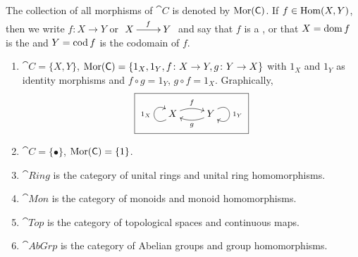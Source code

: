 The collection of all morphisms of $\cat C$ is denoted by $\operatorname{Mor}(\mathsf{C})$. If $f \in \operatorname{Hom}(X, Y)$, then we write $f \colon X \to Y$ or $\xymatrix{X \ar[r]^f & Y}$ and say that $f$ is a , or that $X = \operatorname{dom} f$ is the  and $Y = \operatorname{cod} f$ is the codomain of $f$.

\begin{Example}\label{ex:Categories}
\begin{enumerate}
\item\label{it:Categories2IsoObj} $\cat C = \{X, Y\}$, $\operatorname{Mor}(\mathsf{C}) = \{1_X, 1_Y, f \colon X \to Y, g \colon Y \to X \}$ with $1_X$ and $1_Y$ as identity morphisms and $f \circ g = 1_Y$, $g \circ f = 1_X$. Graphically,
\begin{equation*}
\boxed{\xymatrix{
X \ar @(ld, lu)^{1_X} \ar @/^/[r]^f & Y \ar @(ru, rd)^{1_Y} \ar @/^/[l]^g
}}
\end{equation*}

\item\label{it:Categories1ObjDisc} $\cat C = \{\bullet\}$, $\operatorname{Mor}(\mathsf{C}) = \{1\}$.

\item\label{it:CategoriesRing} $\cat{Ring}$ is the category of unital rings and unital ring homomorphisms.

\item\label{it:CategoriesMon} $\cat{Mon}$ is the category of monoids and monoid homomorphisms.

\item\label{it:CategoriesTop} $\cat{Top}$ is the category of topological spaces and continuous maps.

\item\label{it:CategoriesAbGrp} $\cat{AbGrp}$ is the category of Abelian groups and group homomorphisms.
\end{enumerate}
\end{Example}

